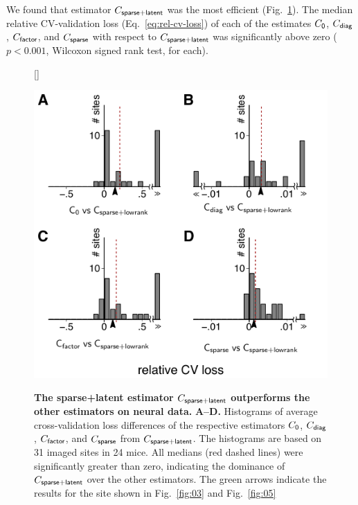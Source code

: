 \documentclass[10pt]{article}
\begin{document}
We found that estimator $C_{\sf sparse+latent}$ was the most efficient (Fig.~\ref{fig:04}). The median relative CV-validation loss (Eq.~\ref{eq:rel-cv-loss}) of each of the estimates $C_{\sf 0}$, $C_{\sf diag}$, $C_{\sf factor}$, and $C_{\sf sparse}$ with respect to $C_{\sf sparse+latent}$ was significantly above zero ($p<0.001$, Wilcoxon signed rank test, for each).

\begin{figure}[!ht]    [\FBwidth]
    {\caption{{\bf The sparse+latent estimator $C_{\sf sparse+latent}$ outperforms the other estimators on neural data.}
    {\bf A--D.} Histograms of average cross-validation loss differences of the respective estimators $C_{\sf 0}$, $C_{\sf diag}$, $C_{\sf factor}$, and $C_{\sf sparse}$ from $C_{\sf sparse+latent}$. 
    The histograms are based on 31 imaged sites in 24 mice. 
    All medians (red dashed lines) were significantly greater than zero, indicating the dominance of $C_{\sf sparse+latent}$ over the other estimators. 
    The green arrows indicate the results for the site shown in Fig.~\ref{fig:03} and Fig.~\ref{fig:05}
    } \label{fig:04}}
    {\includegraphics{./figures/Figure04.pdf}}
\end{figure}
\end{document}

